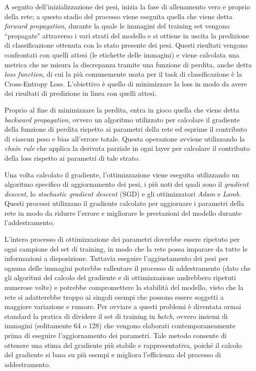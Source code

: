 A seguito dell'inizializzazione dei pesi, inizia la fase di allenamento vero e proprio della rete; a questo stadio del processo viene eseguita quella che viene detta \textit{forward propagation}, durante la quale le immagini del training set vengono ``propagate" attraverso i vari strati del modello e si ottiene in uscita la predizione di classificazione ottenuta con lo stato presente dei pesi. Questi risultati vengono confrontati con quelli attesi (le etichette delle immagini) e viene calcolata una metrica che ne misura la discrepanza tramite una funzione di perdita, anche detta \textit{loss function}, di cui la più comunemente usata per il task di classificazione è la Cross-Entropy Loss. L'obiettivo è quello di minimizzare la loss in modo da avere dei risultati di predizione in linea con quelli attesi.

Proprio al fine di minimizzare la perdita, entra in gioco quella che viene detta \textit{backward propagation}, ovvero un algoritmo utilizzato per calcolare il gradiente della funzione di perdita rispetto ai parametri della rete ed esprime il contributo di ciascun peso e bias all'errore totale. Questa operazione avviene utilizzando la \textit{chain rule} che applica la derivata parziale in ogni layer per calcolare il contributo della loss rispetto ai parametri di tale strato.

Una volta calcolato il gradiente, l'ottimizzazione viene eseguita utilizzando un algoritmo specifico di aggiornamento dei pesi, i più noti dei quali sono il \textit{gradient descent}, lo \textit{stochastic gradient descent} (SGD) e gli ottimizzatori \textit{Adam} e \textit{Lamb}. Questi processi utilizzano il gradiente calcolato per aggiornare i parametri della rete in modo da ridurre l'errore e migliorare le prestazioni del modello durante l'addestramento.

L'intero processo di ottimizzazione dei parametri dovrebbe essere ripetuto per ogni campione del set di training, in modo che la rete possa imparare da tutte le informazioni a disposizione. Tuttavia eseguire l'aggiustamento dei pesi per ognuna delle immagini potrebbe rallentare il processo di addestramento (dato che gli algoritmi del calcolo del gradiente e di ottimizzazione andrebbero ripetuti numerose volte) e potrebbe compromettere la stabilità del modello, visto che la rete si adatterebbe troppo ai singoli esempi che possono essere soggetti a maggiore variazione e rumore.
Per ovviare a questi problemi è diventata ormai standard la pratica di dividere il set di training in \textit{batch}, ovvero insiemi di immagini (solitamente 64 o 128) che vengono elaborati contemporaneamente prima di eseguire l'aggiornamento dei parametri. Tale metodo consente di ottenere una stima del gradiente più stabile e rappresentativa, poiché il calcolo del gradiente si basa su più esempi e migliora l'efficienza del processo di addestramento.

